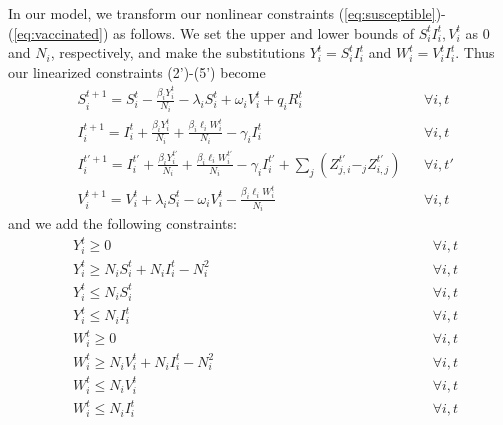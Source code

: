\documentclass{article}
\begin{document}
In our model, we transform our nonlinear constraints (\ref{eq:susceptible})-(\ref{eq:vaccinated}) as follows. We set the upper and lower bounds of $S_i^t I_i^t, V_i^t$ as $0$ and $N_i$, respectively, and make the substitutions $ Y_i^t = S_i^t I_i^t $ and $ W_i^t = V_i^t I_i^t $. Thus our linearized constraints (2')-(5') become
\begin{align}
    &S_i^{t+1} = S_i^t - \frac{\beta_i Y_i^t}{N_i} - \lambda_i S_i^t + \omega_i V_i^t + q_i R_i^t && \forall i, t \tag{2'} \label{eq:linearized_susceptible} \\
    &I_i^{t+1} = I_i^t + \frac{\beta_i Y_i^t}{N_i} + \frac{\beta_i \ell_i W_i^t}{N_i} - \gamma_i I_i^t && \forall i, t \tag{3'} \label{eq:linearized_infected} \\
    &I_i^{t'+1} = I_i^{t'} + \frac{\beta_i Y_i^{t'}}{N_i} + \frac{\beta_i \ell_i W_i^{t'}}{N_i} - \gamma_i I_i^{t'} + \sum_j (Z_{j,i}^{t'} - _j Z_{i,j}^{t'}) && \forall i, t' \tag{4'} \label{eq:linearized_infected_transfer} \\
    &V_i^{t+1} = V_i^t + \lambda_i S_i^t - \omega_i V_i^t - \frac{\beta_i \ell_i W_i^t}{N_i} && \forall i, t \tag{5'} \label{eq:linearized_vaccinated}
\end{align}
and we add the following constraints:
\begin{align}
    &Y_i^t \geq 0 && \forall i, t \tag{15} \label{eq:Y_nonnegativity} \\
    &Y_i^t \geq N_i S_i^t + N_i I_i^t - N_i^2 && \forall i, t \tag{16} \label{eq:Y_lower_bound} \\
    &Y_i^t \leq N_i S_i^t && \forall i, t \tag{17} \label{eq:Y_upper_bound_S} \\
    &Y_i^t \leq N_i I_i^t && \forall i, t \tag{18} \label{eq:Y_upper_bound_I} \\
    &W_i^t \geq 0 && \forall i, t \tag{19} \label{eq:W_nonnegativity} \\
    &W_i^t \geq N_i V_i^t + N_i I_i^t - N_i^2 \quad \quad \quad \quad \quad \quad \quad \quad \quad \quad \quad \quad \quad \quad && \forall i, t \tag{20}\label{eq:W_lower_bound} \\
    &W_i^t \leq N_i V_i^t && \forall i, t \tag{21} \label{eq:W_upper_bound_X} \\
    &W_i^t \leq N_i I_i^t && \forall i, t \tag{22} \label{eq:W_upper_bound_I}
\end{align}
\end{document}
